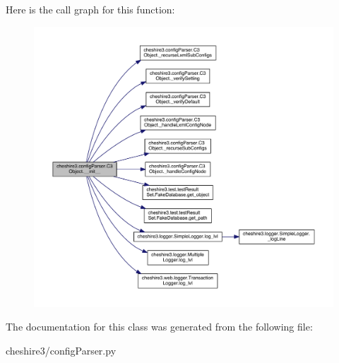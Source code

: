 Here is the call graph for this function\-:
\nopagebreak
\begin{figure}[H]
\begin{center}
\leavevmode
\includegraphics[width=350pt]{classcheshire3_1_1config_parser_1_1_c3_object_a1e28f1191801574a39497fb42704c194_cgraph}
\end{center}
\end{figure}




The documentation for this class was generated from the following file\-:\begin{DoxyCompactItemize}
\item 
cheshire3/config\-Parser.\-py\end{DoxyCompactItemize}
